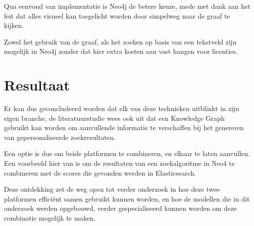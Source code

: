 Qua eenvoud van implementatie is Neo4j de betere keuze, mede met dank aan het feit dat alles visueel kan toegelicht worden door simpelweg naar de graaf te kijken. 

Zowel het gebruik van de graaf, als het zoeken op basis van een tekstveld zijn mogelijk in Neo4j zonder dat hier extra kosten aan vast hangen voor licenties. 

\section{Resultaat}
\label{sec:Resultaat}

Er kan dus geconcludeerd worden dat elk van deze technieken uitblinkt in zijn eigen branche, de literatuurstudie wees ook uit dat een Knowledge Graph gebruikt kan worden om aanvullende informatie te verschaffen bij het genereren van gepersonaliseerde zoekresultaten. 

Een optie is dus om beide platformen te combineren, en elkaar te laten aanvullen. Een voorbeeld hier van is om de resultaten van een zoekalgoritme in Neo4 te combineren met de scores die gevonden werden in Elasticsearch. 

Deze ontdekking zet de weg open tot verder onderzoek in hoe deze twee platformen efficiënt samen gebruikt kunnen worden, en hoe de modellen die in dit onderzoek werden opgebouwd, verder gespecialiseerd kunnen worden om deze combinatie mogelijk te maken. 
